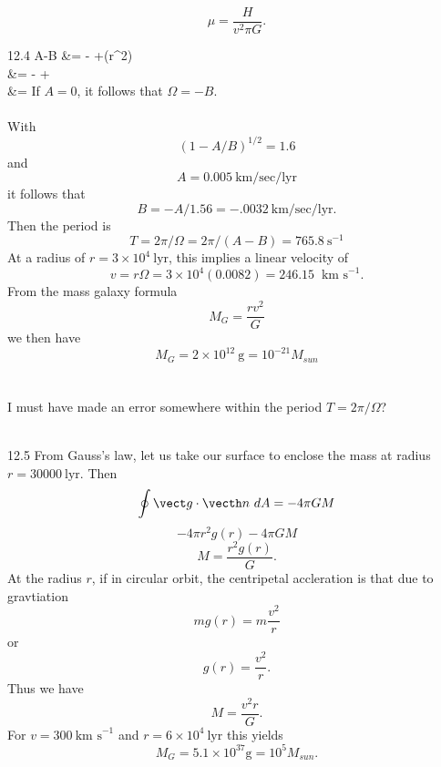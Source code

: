 \documentclass[10pt,letterpaper]{article}
\begin{document}
\[
	\mu = \frac{H}{v^2\pi G}.
\]
\item[12.4]
\ba
	A-B &= -  +(r^2\Omega)\\
	&=  -  + \\
	&= \Omega 
\ea
If $A=0$, it follows that $\Omega = -B$. \\ \\
With 
\[
	(1-A/B)^{1/2} = 1.6
\]
and 
\[
	A = 0.005\ \text{km/sec/lyr}
\]
it follows that 
\[
 	B = -A/1.56 = -.0032\ \text{km/sec/lyr}.
\]
Then the period is
\[
	T=2\pi/\Omega = 2\pi/(A-B) = 765.8\ \text{s}^{-1}
\]
At a radius of $r=3\times 10^4\ \text{lyr}$, this implies a linear velocity of
\[
	v = r\Omega = 3\times 10^4 (0.0082) = 246.15\ \text{ km s}^{-1}.
\]
From the mass galaxy formula
\[
	M_G = \frac{rv^2}{G} 
\] 
we then have
\[
	M_G = 2\times 10^12\ \text{g} = 10^{-21} M_{sun}
\]
\\ \\
I must have made an error somewhere within the period $T = 2\pi/\Omega$?
\\ \\
\item[12.5]
From Gauss's law, let us take our surface to enclose the mass at radius $r = 30000\ \text{lyr}$. Then
\[
	\oint \vect g\cdot \vecth n \ dA = -4\pi G M
\]
\[
	-4\pi r^2 g(r) - 4\pi GM
\]
\[
	M = \frac{r^2g(r)}{G}.
\]
At the radius $r$, if in circular orbit, the centripetal accleration is that due to gravtiation
\[
	mg(r) = m \frac{v^2}{r}
\]
or
\[
	g(r) = \frac{v^2}{r}.
\]
Thus we have
\[
	M = \frac{v^2r}{G}.
\]
For $v= 300\ \text{km s}^{-1}$ and $r = 6\times 10^4\ \text{lyr}$ this yields
\[
	M_G = 5.1\times 10^{37} \text{g} = 10^5 M_{sun}.
\]
\eenum
\end{document}
